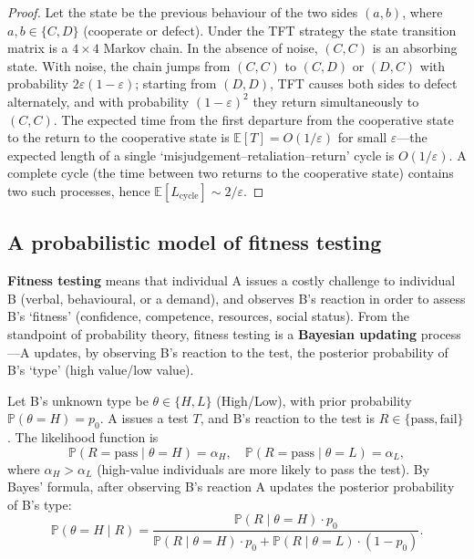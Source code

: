 \begin{proof}
Let the state be the previous behaviour of the two sides $(a, b)$, where $a, b \in \{C, D\}$ (cooperate or defect). Under the TFT strategy the state transition matrix is a $4 \times 4$ Markov chain. In the absence of noise, $(C, C)$ is an absorbing state. With noise, the chain jumps from $(C, C)$ to $(C, D)$ or $(D, C)$ with probability $2\varepsilon(1-\varepsilon)$; starting from $(D, D)$, TFT causes both sides to defect alternately, and with probability $(1-\varepsilon)^2$ they return simultaneously to $(C, C)$. The expected time from the first departure from the cooperative state to the return to the cooperative state is $\mathbb{E}[T] = O(1/\varepsilon)$ for small $\varepsilon$---the expected length of a single `misjudgement--retaliation--return' cycle is $O(1/\varepsilon)$. A complete cycle (the time between two returns to the cooperative state) contains two such processes, hence $\mathbb{E}[L_{\text{cycle}}] \sim 2/\varepsilon$.
\end{proof}

\subsection{A probabilistic model of fitness testing}

\begin{definition}\label{def:shittest}
\textbf{Fitness testing} means that individual A issues a costly challenge to individual B (verbal, behavioural, or a demand), and observes B's reaction in order to assess B's `fitness' (confidence, competence, resources, social status). From the standpoint of probability theory, fitness testing is a \textbf{Bayesian updating} process---A updates, by observing B's reaction to the test, the posterior probability of B's `type' (high value/low value).

Let B's unknown type be $\theta \in \{H, L\}$ (High/Low), with prior probability $\mathbb{P}(\theta = H) = p_0$. A issues a test $T$, and B's reaction to the test is $R \in \{\text{pass}, \text{fail}\}$. The likelihood function is
\[
\mathbb{P}(R = \text{pass} \mid \theta = H) = \alpha_H, \quad \mathbb{P}(R = \text{pass} \mid \theta = L) = \alpha_L,
\]
where $\alpha_H > \alpha_L$ (high-value individuals are more likely to pass the test). By Bayes' formula, after observing B's reaction A updates the posterior probability of B's type:
\[
\mathbb{P}(\theta = H \mid R) = \frac{\mathbb{P}(R \mid \theta = H) \cdot p_0}{\mathbb{P}(R \mid \theta = H) \cdot p_0 + \mathbb{P}(R \mid \theta = L) \cdot (1-p_0)}.
\]
\end{definition}

